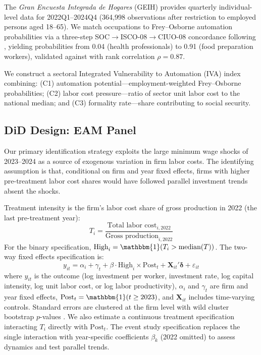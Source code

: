 \documentclass[a4paper,fleqn]{cas-sc}
\begin{document}
The \textit{Gran Encuesta Integrada de Hogares} (GEIH) provides quarterly individual-level data for 2022Q1--2024Q4 (364,998 observations after restriction to employed persons aged 18--65). We match occupations to Frey--Osborne automation probabilities via a three-step SOC$\to$ISCO-08$\to$CIUO-08 concordance following \citet{morales2023risk}, yielding probabilities from 0.04 (health professionals) to 0.91 (food preparation workers), validated against \citet{arntz2016} with rank correlation $\rho = 0.87$.

We construct a sectoral Integrated Vulnerability to Automation (IVA) index combining: (C1) automation potential---employment-weighted Frey--Osborne probabilities; (C2) labor cost pressure---ratio of sector unit labor cost to the national median; and (C3) formality rate---share contributing to social security.

\subsection{DiD Design: EAM Panel}
\label{subsec:did_eam}

Our primary identification strategy exploits the large minimum wage shocks of 2023--2024 as a source of exogenous variation in firm labor costs. The identifying assumption is that, conditional on firm and year fixed effects, firms with higher pre-treatment labor cost shares would have followed parallel investment trends absent the shocks.

Treatment intensity is the firm's labor cost share of gross production in 2022 (the last pre-treatment year):
\begin{equation}
\label{eq:treatment}
T_i = \frac{\text{Total labor cost}_{i,2022}}{\text{Gross production}_{i,2022}}
\end{equation}
For the binary specification, $\text{High}_i = \mathbbm{1}(T_i > \text{median}(T))$. The two-way fixed effects specification is:
\begin{equation}
\label{eq:did_main}
y_{it} = \alpha_i + \gamma_t + \beta \cdot \text{High}_i \times \text{Post}_t + \mathbf{X}_{it}'\boldsymbol{\delta} + \varepsilon_{it}
\end{equation}
where $y_{it}$ is the outcome (log investment per worker, investment rate, log capital intensity, log unit labor cost, or log labor productivity), $\alpha_i$ and $\gamma_t$ are firm and year fixed effects, $\text{Post}_t = \mathbbm{1}(t \geq 2023)$, and $\mathbf{X}_{it}$ includes time-varying controls. Standard errors are clustered at the firm level with wild cluster bootstrap $p$-values \citep{cameron2008bootstrap}. We also estimate a continuous treatment specification interacting $T_i$ directly with $\text{Post}_t$. The event study specification replaces the single interaction with year-specific coefficients $\beta_k$ (2022 omitted) to assess dynamics and test parallel trends.
\end{document}
